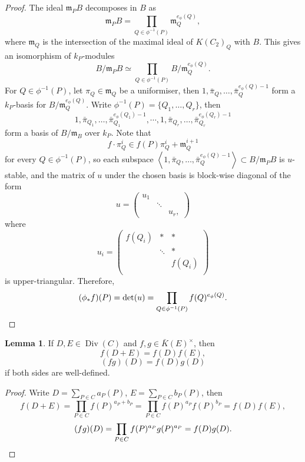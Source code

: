 \documentclass{article}
\theoremstyle{definition}
\newtheorem{lemma}{Lemma}
\theoremstyle{remark}
\DeclareMathOperator{\Div}{Div}
\newcommand{\m}{\mathfrak{m}}
\begin{document}
\begin{proof}
    The ideal $\m_PB$ decomposes in $B$ as\[\m_PB = \prod_{Q\in\phi^{-1}(P)}\m_Q^{e_{\phi}(Q)},\]
    where $\m_Q$ is the intersection of the maximal ideal of $K(C_2)_Q$ with $B$.
    This gives an isomorphism of $k_P$-modules \[B/\m_PB \simeq \prod_{Q\in\phi^{-1}(P)} B/\m_Q^{e_{\phi}(Q)}.\]
    For $Q\in \phi^{-1}(P)$, let $\pi_Q\in\mathfrak{m}_Q$ be a uniformiser, then $1, \bar{\pi}_Q, \dots, \bar{\pi}_Q^{e_\phi(Q) - 1}$ form a $k_P$-basis for $B/\m_Q^{e_{\phi}(Q)}$.
    Write $\phi^{-1}(P) = \{Q_1, \dots, Q_r\}$, then \[1, \bar{\pi}_{Q_1}, \dots, \bar{\pi}_{Q_1}^{e_{\phi}(Q_1)-1},\cdots, 1, \bar\pi_{Q_r}, \dots, \bar\pi_{Q_r}^{e_{\phi}(Q_r)-1}\] form a basis of $B/\mathfrak{m}_B$ over $k_P$.
    Note that \[f\cdot\pi_Q^i \in f(P)\pi_Q^i + \m_Q^{i+1}\]
    for every $Q\in\phi^{-1}(P)$, so each subspace $\left< 1, \bar{\pi}_{Q}, \dots, \bar{\pi}_{Q}^{e_{\phi}(Q)-1} \right>\subset  B/\m_PB$ is $u$-stable, and the matrix of $u$ under the chosen basis is block-wise diagonal of the form \[u = \begin{pmatrix}
        u_1  &      & \\
                & \ddots & \\
                &        & u_r,
    \end{pmatrix}\]where \[u_i = \begin{pmatrix}
        f(Q_i) & * & * \\
        & \ddots & * \\
        & & f(Q_i) \\
    \end{pmatrix}\] is upper-triangular.
    Therefore, \[(\phi_*f)(P) = \det(u) = \prod_{Q\in \phi^{-1}(P)} f(Q)^{e_\phi(Q)}.\qedhere\]
\end{proof}

\begin{lemma}\label{apply function to divisor is multiplicative}
    If $D, E\in\Div(C)$ and $f, g\in\bar{K}(E)^\times$,
    then \[f(D + E) = f(D)f(E),\]\[(fg)(D) = f(D)g(D)\]
    if both sides are well-defined.
\end{lemma}
\begin{proof}
    Write $D = \sum_{P\in C}a_P(P)$, $E = \sum_{P\in C}b_P(P)$, then \[f(D+E) = \prod_{P\in C} f(P)^{a_P+b_P} = 
    \prod_{P\in C} f(P)^{a_P}f(P)^{b_P} = f(D)f(E),\]
    \[(fg)(D) = \prod_{P\in C}f(P)^{a_P}g(P)^{a_P} = f(D)g(D).\qedhere\]
\end{proof}
\end{document}
